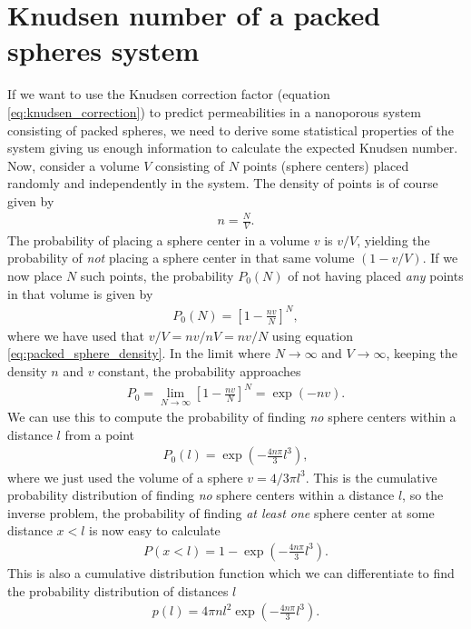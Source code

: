 \chapter{Knudsen number of a packed spheres system}
If we want to use the Knudsen correction factor (equation \eqref{eq:knudsen_correction}) to predict permeabilities in a nanoporous system consisting of packed spheres, we need to derive some statistical properties of the system giving us enough information to calculate the expected Knudsen number. Now, consider a volume $V$ consisting of $N$ points (sphere centers) placed randomly and independently in the system. The density of points is of course given by
\begin{align}
	\label{eq:packed_sphere_density}
	n = \frac{N}{V}.
\end{align}
The probability of placing a sphere center in a volume $v$ is $v/V$, yielding the probability of \textit{not} placing a sphere center in that same volume $(1 - v/V)$. If we now place $N$ such points, the probability $P_0(N)$ of not having placed \textit{any} points in that volume is given by
\begin{align}
	P_0(N) = \left[1 - \frac{nv}{N}\right]^N,
\end{align}
where we have used that $v/V = nv/nV = nv/N$ using equation \eqref{eq:packed_sphere_density}. In the limit where $N\rightarrow\infty$ and $V\rightarrow\infty$, keeping the density $n$ and $v$ constant, the probability approaches
\begin{align}
	P_0 = \lim_{N\rightarrow\infty}\left[1 - \frac{nv}{N}\right]^N = \exp(-nv).
\end{align}
We can use this to compute the probability of finding \textit{no} sphere centers within a distance $l$ from a point
\begin{align}
	\label{eq:packed_sphere_p0}
	P_0(l) = \exp\left(-\frac{4n\pi}{3}l^3\right),
\end{align}
where we just used the volume of a sphere $v=4/3\pi l^3$. This is the cumulative probability distribution of finding \textit{no} sphere centers within a distance $l$, so the inverse problem, the probability of finding \textit{at least one} sphere center at some distance $x<l$ is now easy to calculate 
\begin{align}
	P(x<l) = 1 - \exp\left(-\frac{4n\pi}{3}l^3\right).
\end{align}
This is also a cumulative distribution function which we can differentiate to find the probability distribution of distances $l$
\begin{align}
	\label{eq:packed_sphere_probability_number_density}
	p(l) = 4\pi n l^2 \exp\left(-\frac{4n\pi}{3}l^3\right).
\end{align}
